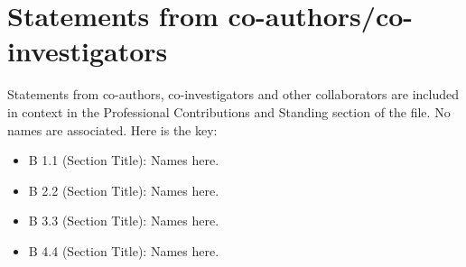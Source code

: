 \documentclass[12pt,oneside]{book}
\begin{document}
\chapter{Statements from co-authors/co-investigators}

Statements from co-authors, co-investigators and other collaborators are included in context in the Professional Contributions and Standing section of the file.  No names are associated.  Here is the key:

\begin{itemize}
  \item B 1.1 (Section Title): Names here.
  \item B 2.2 (Section Title): Names here.
  \item B 3.3 (Section Title): Names here.
  \item B 4.4 (Section Title): Names here.
\end{itemize}
\end{document}
